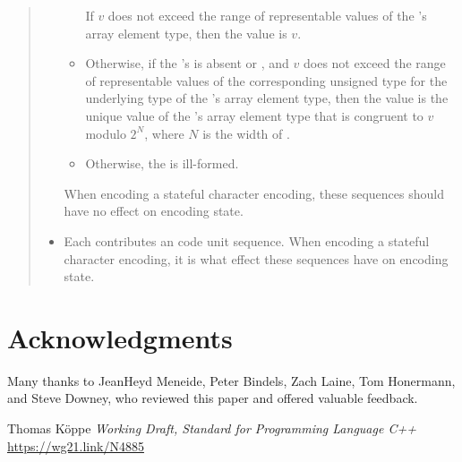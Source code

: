 \documentclass{wg21}
\begin{document}
\begin{quote}
\begin{itemize}
\begin{itemize}
        If $v$ does not exceed the range of representable values of
        the 's array element type,
        then the value is $v$.
        \item
        Otherwise,
        if the 's 
        is absent or , and
        $v$ does not exceed the range of representable values of
        the corresponding unsigned type for the underlying type of
        the 's array element type,
        then the value is the unique value of
        the 's array element type 
        that is congruent to $v$ modulo $2^N$, where $N$ is the width of .
        \item
        Otherwise, the  is ill-formed.
    \end{itemize}
    When encoding a stateful character encoding,
    these sequences should have no effect on encoding state.
    \item
    Each 
    contributes an
    code unit sequence.
    When encoding a stateful character encoding,
    it is
    what effect these sequences have on encoding state.
\end{itemize}




\end{quote}

\section{Acknowledgments}

Many thanks to JeanHeyd Meneide, Peter Bindels, Zach Laine, Tom Honermann, and Steve Downey, who reviewed this paper and offered valuable feedback.






\renewcommand{\section}[2]{}%
\begin{thebibliography}{9}
Thomas Köppe
\emph{Working Draft, Standard for Programming Language C++}\newline
\url{https://wg21.link/N4885}
\end{thebibliography}
\end{document}
